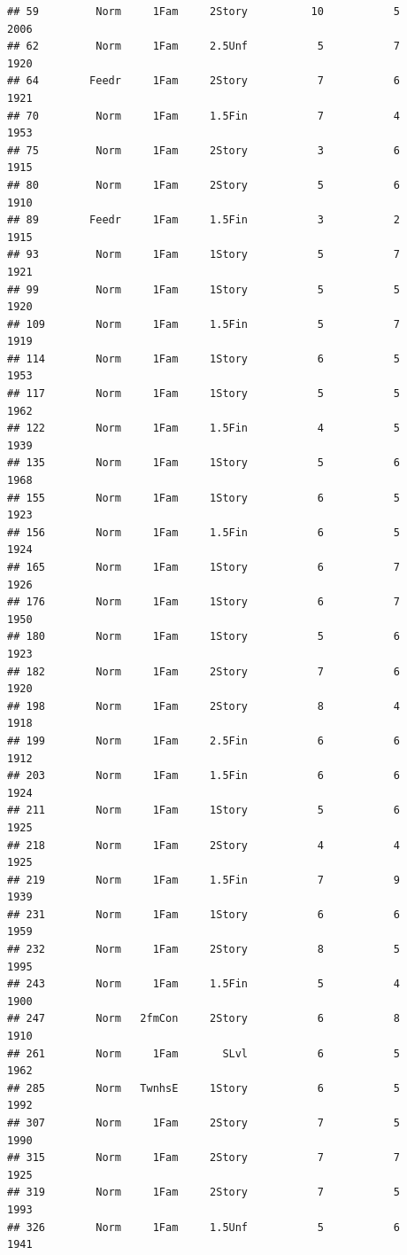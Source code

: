 \documentclass[]{article}
\begin{document}
\begin{verbatim}
## 59         Norm     1Fam     2Story          10           5      2006
## 62         Norm     1Fam     2.5Unf           5           7      1920
## 64        Feedr     1Fam     2Story           7           6      1921
## 70         Norm     1Fam     1.5Fin           7           4      1953
## 75         Norm     1Fam     2Story           3           6      1915
## 80         Norm     1Fam     2Story           5           6      1910
## 89        Feedr     1Fam     1.5Fin           3           2      1915
## 93         Norm     1Fam     1Story           5           7      1921
## 99         Norm     1Fam     1Story           5           5      1920
## 109        Norm     1Fam     1.5Fin           5           7      1919
## 114        Norm     1Fam     1Story           6           5      1953
## 117        Norm     1Fam     1Story           5           5      1962
## 122        Norm     1Fam     1.5Fin           4           5      1939
## 135        Norm     1Fam     1Story           5           6      1968
## 155        Norm     1Fam     1Story           6           5      1923
## 156        Norm     1Fam     1.5Fin           6           5      1924
## 165        Norm     1Fam     1Story           6           7      1926
## 176        Norm     1Fam     1Story           6           7      1950
## 180        Norm     1Fam     1Story           5           6      1923
## 182        Norm     1Fam     2Story           7           6      1920
## 198        Norm     1Fam     2Story           8           4      1918
## 199        Norm     1Fam     2.5Fin           6           6      1912
## 203        Norm     1Fam     1.5Fin           6           6      1924
## 211        Norm     1Fam     1Story           5           6      1925
## 218        Norm     1Fam     2Story           4           4      1925
## 219        Norm     1Fam     1.5Fin           7           9      1939
## 231        Norm     1Fam     1Story           6           6      1959
## 232        Norm     1Fam     2Story           8           5      1995
## 243        Norm     1Fam     1.5Fin           5           4      1900
## 247        Norm   2fmCon     2Story           6           8      1910
## 261        Norm     1Fam       SLvl           6           5      1962
## 285        Norm   TwnhsE     1Story           6           5      1992
## 307        Norm     1Fam     2Story           7           5      1990
## 315        Norm     1Fam     2Story           7           7      1925
## 319        Norm     1Fam     2Story           7           5      1993
## 326        Norm     1Fam     1.5Unf           5           6      1941

\end{verbatim}
\end{document}
